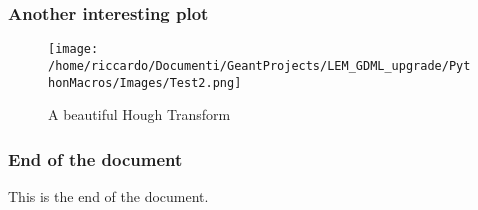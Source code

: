 \documentclass[8pt]{beamer}
\begin{document}
        \begin{frame}
            \frametitle{Another interesting plot}
        
        \begin{figure}[h]
            \centering
            \texttt{[image: /home/riccardo/Documenti/GeantProjects/LEM\_GDML\_upgrade/PythonMacros/Images/Test2.png]}
            \caption{A beautiful Hough Transform}
        \end{figure}
        
        \end{frame}
        
        \begin{frame}
            \frametitle{End of the document}
        
This is the end of the document.

        \end{frame}
        
        
\end{document}

